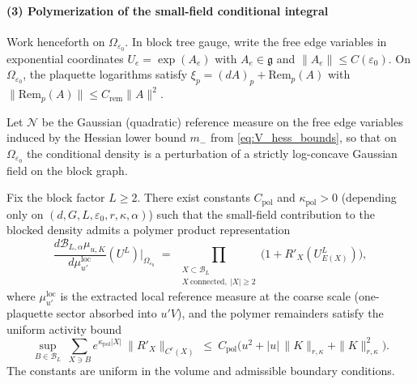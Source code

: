 \paragraph*{(3) Polymerization of the small-field conditional integral}

Work henceforth on $\Omega_{\varepsilon_0}$.
In block tree gauge, write the free edge variables in exponential coordinates $U_e=\exp(A_e)$ with $A_e\in\mathfrak g$ and
$\|A_e\|\le C(\varepsilon_0)$.
On $\Omega_{\varepsilon_0}$, the plaquette logarithms satisfy
$\xi_p = (dA)_p + \mathrm{Rem}_p(A)$ with $\|\mathrm{Rem}_p(A)\|\le C_{\mathrm{rem}}\|A\|^2$.

Let $\mathcal N$ be the Gaussian (quadratic) reference measure on the free edge variables induced by the Hessian lower bound
$m_-$ from \eqref{eq:V_hess_bounds}, so that on $\Omega_{\varepsilon_0}$ the conditional density is a perturbation of a strictly log-concave
Gaussian field on the block graph.

\begin{lemma}\label{lem:h47_polymer_activity_bound}
Fix the block factor $L\ge 2$.
There exist constants $C_{\mathrm{pol}}$ and $\kappa_{\mathrm{pol}}>0$ (depending only on $(d,G,L,\varepsilon_0,r,\kappa,\alpha)$) such that the
small-field contribution to the blocked density admits a polymer product representation
\begin{equation}\label{eq:h47_polymer_product}
\frac{d\mathcal B_{L,\alpha}\mu_{u,K}}{d\mu^{\mathrm{loc}}_{u'}}(U^L)\Bigg|_{\Omega_{\varepsilon_0}}
\;=\;
\prod_{\substack{X\subset \mathcal B_L\\ X\ \mathrm{connected},\ |X|\ge 2}}
\bigl(1+R'_X(U^L_{E(X)})\bigr),
\end{equation}
where $\mu^{\mathrm{loc}}_{u'}$ is the extracted local reference measure at the coarse scale (one-plaquette sector absorbed into $u'V$),
and the polymer remainders satisfy the uniform activity bound
\begin{equation}\label{eq:h47_activity_bound}
\sup_{B\in\mathcal B_L}\ \sum_{X\ni B} e^{\kappa_{\mathrm{pol}}|X|}\ \|R'_X\|_{C^r(X)}
\ \le\ C_{\mathrm{pol}}\bigl(u^2 + |u|\,\|K\|_{r,\kappa}+\|K\|_{r,\kappa}^2\bigr).
\end{equation}
The constants are uniform in the volume and admissible boundary conditions.
\end{lemma}

